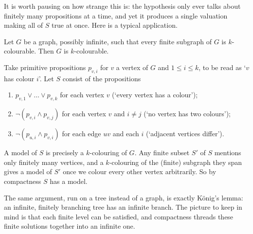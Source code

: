 \documentclass[a4paper]{scrartcl}
\begin{document}
It is worth pausing on how strange this is: the hypothesis only ever talks about finitely many propositions at a time, and yet it produces a single valuation making all of $S$ true at once. Here is a typical application.

\begin{example}
  Let $G$ be a graph, possibly infinite, such that every finite subgraph of $G$ is $k$-colourable. Then $G$ is $k$-colourable.

  Take primitive propositions $p_{v, i}$ for $v$ a vertex of $G$ and $1 \leq i \leq k$, to be read as `$v$ has colour $i$'. Let $S$ consist of the propositions
  \begin{enumerate}[label=(\roman*)]
    \item $p_{v, 1} \lor \dots \lor p_{v, k}$ for each vertex $v$ (`every vertex has a colour');
    \item $\lnot(p_{v, i} \land p_{v, j})$ for each vertex $v$ and $i \neq j$ (`no vertex has two colours');
    \item $\lnot (p_{u, i} \land p_{v, i})$ for each edge $uv$ and each $i$ (`adjacent vertices differ').
  \end{enumerate}
  A model of $S$ is precisely a $k$-colouring of $G$. Any finite subset $S'$ of $S$ mentions only finitely many vertices, and a $k$-colouring of the (finite) subgraph they span gives a model of $S'$ once we colour every other vertex arbitrarily. So by compactness $S$ has a model.
\end{example}

The same argument, run on a tree instead of a graph, is exactly K\"onig's lemma: an infinite, finitely branching tree has an infinite branch. The picture to keep in mind is that each finite level can be satisfied, and compactness threads these finite solutions together into an infinite one.

\begin{center}
\end{center}
\end{document}
